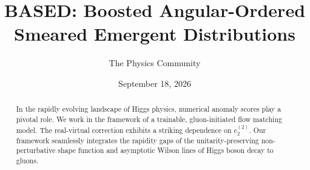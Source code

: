 \documentclass[11pt]{article}
\title{BASED: Boosted Angular-Ordered Smeared Emergent Distributions}
\author{The Physics Community}
\date{September 18, 2026}
\numberwithin{equation}{section}
\theoremstyle{definition}
\theoremstyle{remark}
\begin{document}
\maketitle
\begin{abstract}
In the rapidly evolving landscape of Higgs physics, numerical anomaly
scores play a pivotal role. We work in the framework of a trainable,
gluon-initiated flow matching model. The real-virtual correction
exhibits a striking dependence on $e_2^{(2)}$. Our framework seamlessly
integrates the rapidity gaps of the unitarity-preserving
non-perturbative shape function and asymptotic Wilson lines of Higgs
boson decay to gluons.
\end{abstract}
\tableofcontents






\nocite{*}


\end{document}
